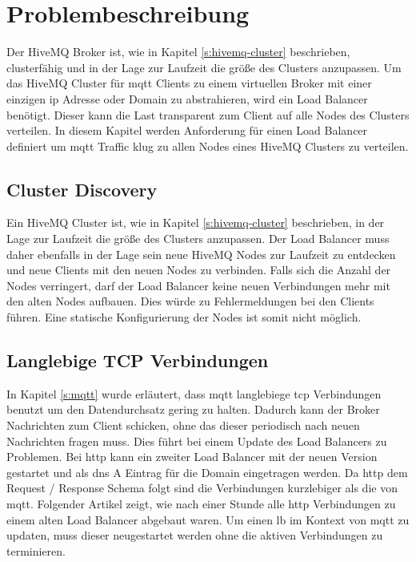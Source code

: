 \section{Problembeschreibung}
Der HiveMQ Broker ist, wie in Kapitel \ref{s:hivemq-cluster} beschrieben, clusterfähig und in der Lage zur Laufzeit die grö{\ss}e des Clusters anzupassen.
Um das HiveMQ Cluster für \ac{mqtt} Clients zu einem virtuellen Broker mit einer einzigen \ac{ip} Adresse oder Domain zu abstrahieren, wird ein Load Balancer benötigt. Dieser kann die Last transparent zum Client auf alle Nodes des Clusters verteilen.
In diesem Kapitel werden Anforderung für einen Load Balancer definiert um \ac{mqtt} Traffic klug zu allen Nodes eines HiveMQ Clusters zu verteilen.

\subsection{Cluster Discovery} \label{sp:cluster-discovery}
Ein HiveMQ Cluster ist, wie in Kapitel \ref{s:hivemq-cluster} beschrieben, in der Lage zur Laufzeit die grö{\ss}e des Clusters anzupassen. Der Load Balancer muss daher ebenfalls in der Lage sein neue HiveMQ Nodes zur Laufzeit zu entdecken und neue Clients mit den neuen Nodes zu verbinden. Falls sich die Anzahl der Nodes verringert, darf der Load Balancer keine neuen Verbindungen mehr mit den alten Nodes aufbauen. Dies würde zu Fehlermeldungen bei den Clients führen.
Eine statische Konfigurierung der Nodes ist somit nicht möglich.

\subsection{Langlebige TCP Verbindungen}
In Kapitel \ref{s:mqtt} wurde erläutert, dass \ac{mqtt} langlebiege \ac{tcp} Verbindungen benutzt um den Datendurchsatz gering zu halten. Dadurch kann der Broker Nachrichten zum Client schicken, ohne das dieser periodisch nach neuen Nachrichten fragen muss.
Dies führt bei einem Update des Load Balancers zu Problemen. Bei \ac{http} kann ein zweiter Load Balancer mit der neuen Version gestartet und als \ac{dns} A Eintrag für die Domain eingetragen werden. Da \ac{http} dem Request / Response Schema folgt sind die Verbindungen kurzlebiger als die von \ac{mqtt}. Folgender Artikel zeigt, wie nach einer Stunde alle \ac{http} Verbindungen zu einem alten Load Balancer abgebaut waren.
Um einen \ac{lb} im Kontext von \ac{mqtt} zu updaten, muss dieser neugestartet werden ohne die aktiven Verbindungen zu terminieren.

